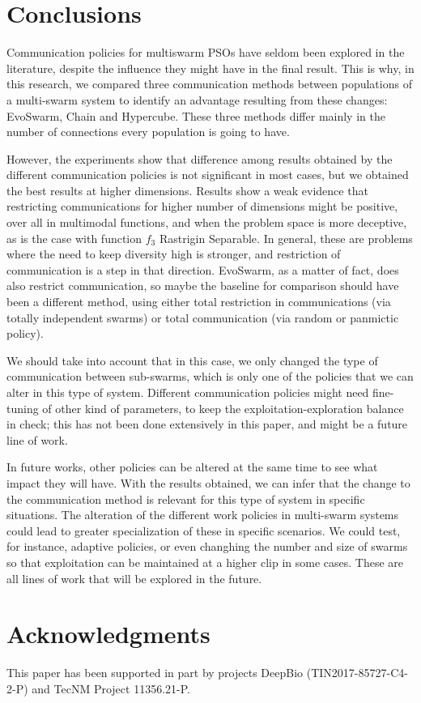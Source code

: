 \documentclass[runningheads]{llncs}
\begin{document}
\section{Conclusions}

Communication policies for multiswarm PSOs have seldom been explored
in the literature, despite the influence they might have in the final
result. This is why, in this research, we compared three communication methods between populations of
a multi-swarm system to identify an advantage resulting from these
changes: EvoSwarm, Chain and Hypercube. These three methods differ
mainly in the number of connections every population is going to
have.

However, the experiments show that difference among results obtained
by the different communication policies is not significant in most cases,
but we obtained the best results at higher dimensions. Results show a
weak evidence that restricting communications for higher number of
dimensions might be positive, over all in multimodal functions, and when the problem space is more deceptive, as is the case with function
$f_{3}$ Rastrigin Separable. In general, these are problems where the
need to keep diversity high is stronger, and restriction of
communication is a step in that direction. EvoSwarm, as a matter of
fact, does also restrict communication, so maybe the baseline for
comparison should have been a different method, using either total
restriction in communications (via totally independent swarms) or
total communication (via random or panmictic policy).

We should take
into account that in this case, we only changed the type of communication
between sub-swarms, which is only one of the policies that we can alter in this
type of system. Different communication policies might need
fine-tuning of other kind of parameters, to keep the
exploitation-exploration balance in check; this has not been done
extensively in this paper, and might be a future line of work.

In future works, other policies can be altered at the same time to see
what impact they will have. With the results obtained, we can infer
that the change to the communication method is relevant for this type
of system in specific situations. The alteration of the different work
policies in multi-swarm systems could lead to greater specialization
of these in specific scenarios. We could test, for instance, adaptive
policies, or even changhing the number and size of swarms so that
exploitation can be maintained at a higher clip in some cases. These
are all lines of work that will be explored in the future.


\section*{Acknowledgments}

This paper has been supported in part by projects DeepBio (TIN2017-85727-C4-2-P)
and TecNM Project 11356.21-P.

\printbibliography
\end{document}
